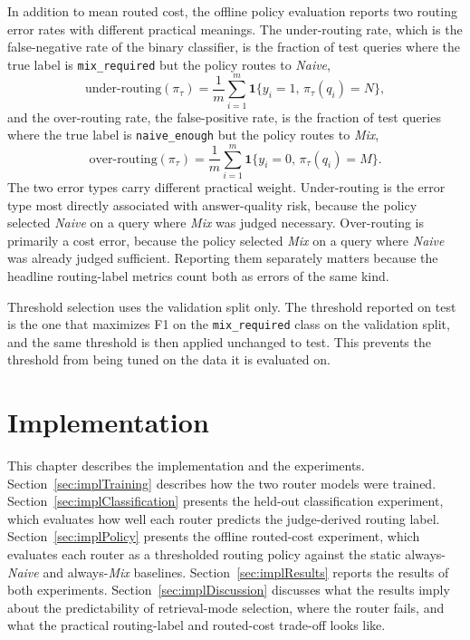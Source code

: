 \documentclass[english, bibtex]{kththesis}               %
\numberwithin{listing}{chapter}
\begin{document}
In addition to mean routed cost, the offline policy evaluation reports two routing error rates with different practical meanings. The under-routing rate, which is the false-negative rate of the binary classifier, is the fraction of test queries where the true label is \texttt{mix\_required} but the policy routes to \emph{Naive},
\begin{equation}
\label{eq:underRouting}
\mathrm{under\text{-}routing}(\pi_\tau)
=
\frac{1}{m}
\sum_{i=1}^{m}
\mathbf{1}\{y_i = 1,\, \pi_\tau(q_i) = N\},
\end{equation}
and the over-routing rate, the false-positive rate, is the fraction of test queries where the true label is \texttt{naive\_enough} but the policy routes to \emph{Mix},
\begin{equation}
\label{eq:overRouting}
\mathrm{over\text{-}routing}(\pi_\tau)
=
\frac{1}{m}
\sum_{i=1}^{m}
\mathbf{1}\{y_i = 0,\, \pi_\tau(q_i) = M\}.
\end{equation}
The two error types carry different practical weight. Under-routing is the error type most directly associated with answer-quality risk, because the policy selected \emph{Naive} on a query where \emph{Mix} was judged necessary. Over-routing is primarily a cost error, because the policy selected \emph{Mix} on a query where \emph{Naive} was already judged sufficient. Reporting them separately matters because the headline routing-label metrics count both as errors of the same kind.

Threshold selection uses the validation split only. The threshold reported on test is the one that maximizes F1 on the \texttt{mix\_required} class on the validation split, and the same threshold is then applied unchanged to test. This prevents the threshold from being tuned on the data it is evaluated on.

\cleardoublepage
\chapter{Implementation}
\label{ch:implementation}

This chapter describes the implementation and the experiments. Section~\ref{sec:implTraining} describes how the two router models were trained. Section~\ref{sec:implClassification} presents the held-out classification experiment, which evaluates how well each router predicts the judge-derived routing label. Section~\ref{sec:implPolicy} presents the offline routed-cost experiment, which evaluates each router as a thresholded routing policy against the static always-\emph{Naive} and always-\emph{Mix} baselines. Section~\ref{sec:implResults} reports the results of both experiments. Section~\ref{sec:implDiscussion} discusses what the results imply about the predictability of retrieval-mode selection, where the router fails, and what the practical routing-label and routed-cost trade-off looks like.
\end{document}
